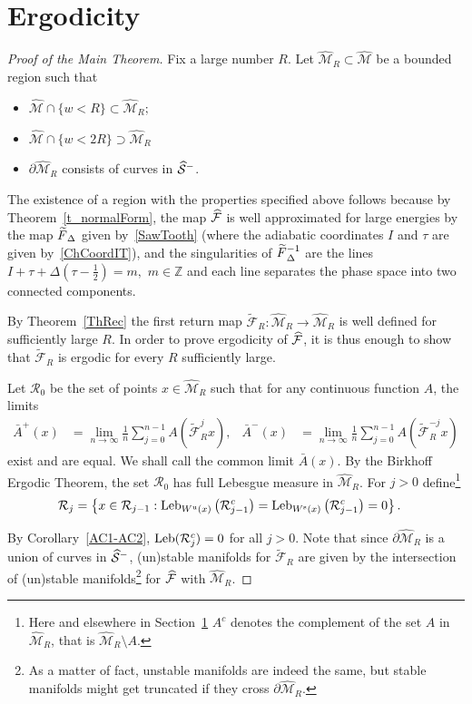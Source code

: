 \documentclass[AHL, Unicode, longabstracts,published]{cedram}
\newcommand{\unstable}{\text{u}}
\newcommand{\stable}{\text{s}}
\newcommand{\bZ}{\mathbb{Z}}
\newcommand{\cR}{\mathcal{R}}
\newcommand{\cm}{\mathcal{F}}
\newcommand{\csp}{\mathcal{M}}
\newcommand{\cmp}{\hat\cm}
\newcommand{\cspi}{\widehat{\csp}}
\newcommand{\brA}{\bar{A}}
\newcommand{\tcF}{\widetilde{\mathcal{F}}}
\newcommand{\Ws}{W^{\stable}}
\newcommand{\Wu}{W^{\unstable}}
\newcommand{\singPrivate}{\mathcal{S}}
\newcommand{\singp}[1]{\hat{\singPrivate}^{#1}}
\newcommand{\Leb}{\textup{Leb}}
\newcommand{\nfr}{\tilde F}
\let\oldtilde\tilde
\renewcommand*{\tilde}[1]{\mathchoice{\widetilde{#1}}{\widetilde{#1}}{\oldtilde{#1}}{\oldtilde{#1}}}
\let\oldhat\hat
\renewcommand*{\hat}[1]{\mathchoice{\widehat{#1}}{\widehat{#1}}{\oldhat{#1}}{\oldhat{#1}}}
\begin{document}
\section{Ergodicity}\label{ScErg}
\begin{proof}[Proof of the Main Theorem]
Fix a large number $R$. Let $\cspi_R\subset \cspi$ be a bounded region such that
\begin{itemize}
\item $\cspi\cap \{w<R\}\subset \cspi_R;$
\item $\cspi\cap \{w<2R\}\supset \cspi_R$
\item $\partial \cspi_R$ consists of curves in $\singp-$.
\end{itemize}

The existence of a region with the properties specified above follows because by Theorem~\ref{t_normalForm}, the map $\cmp$ is well approximated for large energies by the map $\nfr_\Delta$ given by~\eqref{SawTooth} (where the adiabatic coordinates $I$ and $\tau$ are given by~\eqref{ChCoordIT}), and the singularities of $\nfr_\Delta^{-1}$ are the lines $I+\tau+\Delta(\tau-\frac{1}{2})=m,$ $m\in \bZ$ and each line separates the phase space into two connected components.

By Theorem~\ref{ThRec} the first return map $\tcF_R:\cspi_R\to\cspi_R$ is well defined for sufficiently large $R$. In order to prove ergodicity of $\cmp$, it is thus enough to show that $\tcF_R$ is ergodic for every $R$ sufficiently large.

Let $\cR_0$ be the set of points $x\in \cspi_R$ such that for any continuous function $A$, the limits
\begin{align*}
\brA^+(x)&=\lim_{n\to\infty} \frac1n\sum_{j=0}^{n-1} A\left(\tcF_R^j x\right),&
\brA^-(x)&=\lim_{n\to\infty} \frac1n\sum_{j=0}^{n-1} A\left(\tcF_R^{-j} x\right)
\end{align*}
exist and are equal. We shall call the common limit $\brA(x)$. By the Birkhoff Ergodic Theorem, the set $\cR_0$ has full Lebesgue measure in $\cspi_R$. For $j > 0$ define\footnote{ Here and elsewhere in Section~\ref{ScErg} $A^c$ denotes the complement of the set $A$ in $\cspi_R$, that is $\cspi_{R}\setminus A$.}
\begin{align*}
\cR_j&=\left\{x\in \cR_{j-1}: \Leb_{\Wu(x)}\left(\cR_{j-1}^c\right) = \Leb_{\Ws(x)}\left(\cR_{j-1}^c\right)=0\right\}.
\end{align*}

By Corollary~\ref{AC1-AC2}, $\Leb(\cR_j^c)=0$ for all $j > 0$. Note that since $\partial\cspi_R$ is a union of curves in $\singp-$, (un)stable manifolds for $\tcF_{R}$ are given by the intersection of (un)stable manifolds\footnote{ As a matter of fact, unstable manifolds are indeed the same, but stable manifolds might get truncated if they cross $\partial\cspi_{R}$.} for $\cmp$ with $\cspi_{R}$.


\end{proof}
\end{document}
